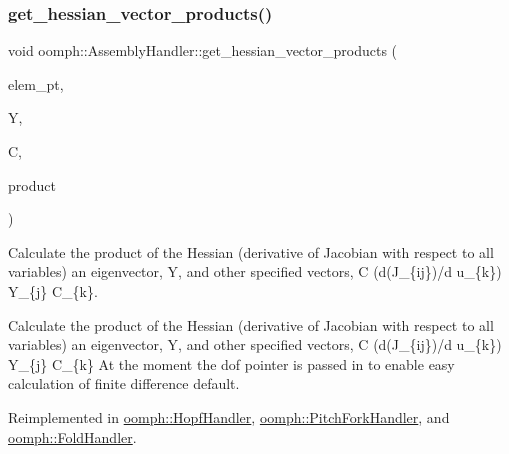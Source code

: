 \mbox{\label{classoomph_1_1AssemblyHandler_a296bef49838d23522bb660c4c5207f03}} 
\subsubsection{\texorpdfstring{get\+\_\+hessian\+\_\+vector\+\_\+products()}{get\_hessian\_vector\_products()}}
{\footnotesize\ttfamily void oomph\+::\+Assembly\+Handler\+::get\+\_\+hessian\+\_\+vector\+\_\+products (\begin{DoxyParamCaption}\item[{\hyperlink{classoomph_1_1GeneralisedElement}{Generalised\+Element} $\ast$const \&}]{elem\+\_\+pt,  }\item[{\hyperlink{classoomph_1_1Vector}{Vector}$<$ double $>$ const \&}]{Y,  }\item[{\hyperlink{classoomph_1_1DenseMatrix}{Dense\+Matrix}$<$ double $>$ const \&}]{C,  }\item[{\hyperlink{classoomph_1_1DenseMatrix}{Dense\+Matrix}$<$ double $>$ \&}]{product }\end{DoxyParamCaption})\hspace{0.3cm}{\ttfamily [virtual]}}



Calculate the product of the Hessian (derivative of Jacobian with respect to all variables) an eigenvector, Y, and other specified vectors, C (d(J\+\_\+\{ij\})/d u\+\_\+\{k\}) Y\+\_\+\{j\} C\+\_\+\{k\}. 

Calculate the product of the Hessian (derivative of Jacobian with respect to all variables) an eigenvector, Y, and other specified vectors, C (d(J\+\_\+\{ij\})/d u\+\_\+\{k\}) Y\+\_\+\{j\} C\+\_\+\{k\} At the moment the dof pointer is passed in to enable easy calculation of finite difference default. 

Reimplemented in \hyperlink{classoomph_1_1HopfHandler_a74b0266ee15bcb294dbb946156095f8c}{oomph\+::\+Hopf\+Handler}, \hyperlink{classoomph_1_1PitchForkHandler_a85e7dba2d21c9fe95a575a115cf3ee9f}{oomph\+::\+Pitch\+Fork\+Handler}, and \hyperlink{classoomph_1_1FoldHandler_aa633b80f1ebdb322350c6832fe6c2b6c}{oomph\+::\+Fold\+Handler}.



